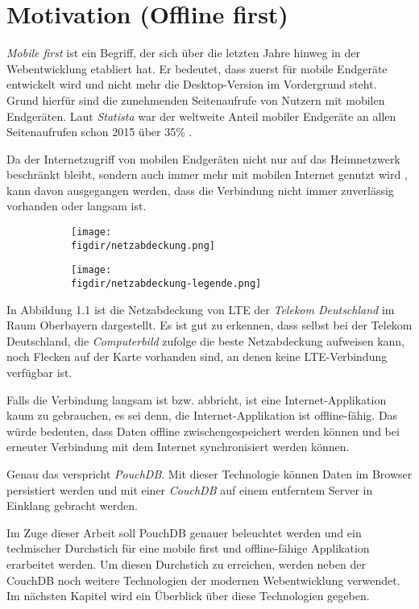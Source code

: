 \chapter{Motivation (Offline first)}
\label{Motivation}

\emph{Mobile first} ist ein Begriff, der sich über die letzten Jahre hinweg in der Webentwicklung etabliert hat. Er bedeutet, dass zuerst für mobile Endgeräte entwickelt wird und nicht mehr die Desktop-Version im Vordergrund steht. Grund hierfür sind die zunehmenden Seitenaufrufe von Nutzern mit mobilen Endgeräten. Laut \emph{Statista} war der weltweite Anteil mobiler Endgeräte an allen Seitenaufrufen schon 2015 über 35\% \cite{statista}.

Da der Internetzugriff von mobilen Endgeräten nicht nur auf das Heimnetzwerk beschränkt bleibt, sondern auch immer mehr mit mobilen Internet genutzt wird \cite{statista:datenverkehr}, kann davon ausgegangen werden, dass die Verbindung nicht immer zuverlässig vorhanden oder langsam ist.

\begin{figure}[htb]
\centering
\caption{LTE Abdeckung der Telekom Deutschland im Raum Oberbayern}
\label{fig:netzabdeckung}
\begin{subfigure}{0.79\textwidth}
\texttt{[image: \\figdir/netzabdeckung.png]}
\end{subfigure}
\begin{subfigure}{0.2\textwidth}
\texttt{[image: \\figdir/netzabdeckung-legende.png]}
\end{subfigure}
\end{figure}

In Abbildung 1.1 ist die Netzabdeckung von LTE der \emph{Telekom Deutschland} im Raum Oberbayern dargestellt. Es ist gut zu erkennen, dass selbst bei der Telekom Deutschland, die \emph{Computerbild} zufolge \cite{computerbild} die beste Netzabdeckung aufweisen kann, noch Flecken auf der Karte vorhanden sind, an denen keine LTE-Verbindung verfügbar ist.

Falls die Verbindung langsam ist bzw. abbricht, ist eine Internet-Applikation kaum zu gebrauchen, es sei denn, die Internet-Applikation ist offline-fähig. Das würde bedeuten, dass Daten offline zwischengespeichert werden können und bei erneuter Verbindung mit dem Internet synchronisiert werden können.

Genau das verspricht \emph{PouchDB}. Mit dieser Technologie können Daten im Browser persistiert werden und mit einer \emph{CouchDB} auf einem entferntem Server in Einklang gebracht werden.

Im Zuge dieser Arbeit soll PouchDB genauer beleuchtet werden und ein technischer Durchstich für eine mobile first und offline-fähige Applikation erarbeitet werden. Um diesen Durchstich zu erreichen, werden neben der CouchDB noch weitere Technologien der modernen Webentwicklung verwendet. Im nächsten Kapitel wird ein Überblick über diese Technologien gegeben.

